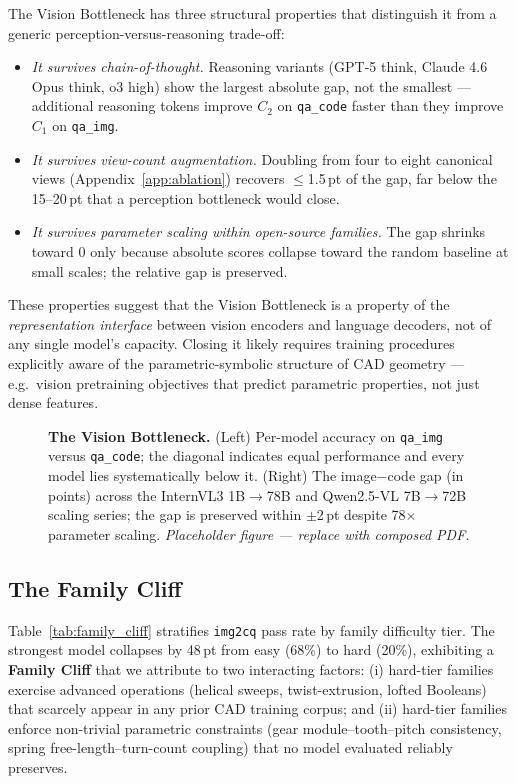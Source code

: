 \documentclass{article}
\begin{document}
The Vision Bottleneck has three structural properties that distinguish it from a generic perception-versus-reasoning trade-off:
\begin{itemize}[leftmargin=1.2em,topsep=2pt,itemsep=1pt]
  \item \emph{It survives chain-of-thought.} Reasoning variants (GPT-5 think, Claude 4.6 Opus think, o3 high) show the largest absolute gap, not the smallest --- additional reasoning tokens improve $C_2$ on \texttt{qa\_code} faster than they improve $C_1$ on \texttt{qa\_img}.
  \item \emph{It survives view-count augmentation.} Doubling from four to eight canonical views (Appendix~\ref{app:ablation}) recovers $\leq$1.5\,pt of the gap, far below the 15--20\,pt that a perception bottleneck would close.
  \item \emph{It survives parameter scaling within open-source families.} The gap shrinks toward 0 only because absolute scores collapse toward the random baseline at small scales; the relative gap is preserved.
\end{itemize}

These properties suggest that the Vision Bottleneck is a property of the \emph{representation interface} between vision encoders and language decoders, not of any single model's capacity. Closing it likely requires training procedures explicitly aware of the parametric-symbolic structure of CAD geometry --- e.g.\ vision pretraining objectives that predict parametric properties, not just dense features.

\begin{figure}[t]
  \centering
  \fbox{\rule[-2cm]{0cm}{4cm} \rule[0cm]{14cm}{0cm}}
  \caption{\textbf{The Vision Bottleneck.} (Left) Per-model accuracy on \texttt{qa\_img} versus \texttt{qa\_code}; the diagonal indicates equal performance and every model lies systematically below it. (Right) The image$-$code gap (in points) across the InternVL3 1B$\to$78B and Qwen2.5-VL 7B$\to$72B scaling series; the gap is preserved within $\pm$2\,pt despite 78$\times$ parameter scaling. \emph{Placeholder figure --- replace with composed PDF.}}
  \label{fig:vision_bottleneck}
\end{figure}

\subsection{The Family Cliff}
\label{sec:exp_cliff}

Table~\ref{tab:family_cliff} stratifies \texttt{img2cq} pass rate by family difficulty tier. The strongest model collapses by 48\,pt from easy (68\%) to hard (20\%), exhibiting a \textbf{Family Cliff} that we attribute to two interacting factors: (i) hard-tier families exercise advanced operations (helical sweeps, twist-extrusion, lofted Booleans) that scarcely appear in any prior CAD training corpus; and (ii) hard-tier families enforce non-trivial parametric constraints (gear module--tooth--pitch consistency, spring free-length--turn-count coupling) that no model evaluated reliably preserves.
\end{document}
